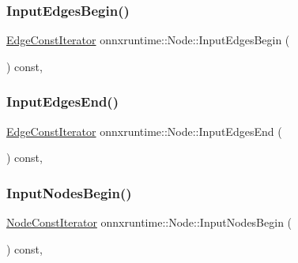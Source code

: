 \mbox{\label{classonnxruntime_1_1Node_ab7e6afa5d6224178d1b43465b63cccb2}} 
\subsubsection{\texorpdfstring{Input\+Edges\+Begin()}{InputEdgesBegin()}}
{\footnotesize\ttfamily \mbox{\hyperlink{classonnxruntime_1_1Node_ae0df52e26b0237505b6a0cbc25106d9d}{Edge\+Const\+Iterator}} onnxruntime\+::\+Node\+::\+Input\+Edges\+Begin (\begin{DoxyParamCaption}{ }\end{DoxyParamCaption}) const\hspace{0.3cm}{\ttfamily [inline]}, {\ttfamily [noexcept]}}

\mbox{\label{classonnxruntime_1_1Node_a0093d2a46230063ae22d83278e3da9bf}} 
\subsubsection{\texorpdfstring{Input\+Edges\+End()}{InputEdgesEnd()}}
{\footnotesize\ttfamily \mbox{\hyperlink{classonnxruntime_1_1Node_ae0df52e26b0237505b6a0cbc25106d9d}{Edge\+Const\+Iterator}} onnxruntime\+::\+Node\+::\+Input\+Edges\+End (\begin{DoxyParamCaption}{ }\end{DoxyParamCaption}) const\hspace{0.3cm}{\ttfamily [inline]}, {\ttfamily [noexcept]}}

\mbox{\label{classonnxruntime_1_1Node_aba20d41c500d0548e7559006eb43fca0}} 
\subsubsection{\texorpdfstring{Input\+Nodes\+Begin()}{InputNodesBegin()}}
{\footnotesize\ttfamily \mbox{\hyperlink{classonnxruntime_1_1Node_1_1NodeConstIterator}{Node\+Const\+Iterator}} onnxruntime\+::\+Node\+::\+Input\+Nodes\+Begin (\begin{DoxyParamCaption}{ }\end{DoxyParamCaption}) const\hspace{0.3cm}{\ttfamily [inline]}, {\ttfamily [noexcept]}}

